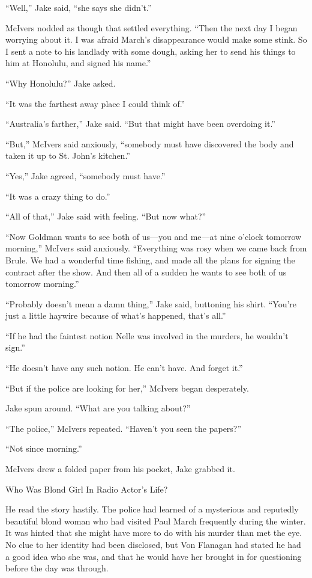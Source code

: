 \documentclass{novel}
\begin{document}
“Well,” Jake said, “she says she didn’t.”

McIvers nodded as though that settled everything. “Then the next day I began worrying about it. I was afraid March’s disappearance would make some stink. So I sent a note to his landlady with some dough, asking her to send his things to him at Honolulu, and signed his name.”

“Why Honolulu?” Jake asked.

“It was the farthest away place I could think of.”

“Australia’s farther,” Jake said. “But that might have been overdoing it.”

“But,” McIvers said anxiously, “somebody must have discovered the body and taken it up to St. John’s kitchen.”

“Yes,” Jake agreed, “somebody must have.”

“It was a crazy thing to do.”

“All of that,” Jake said with feeling. “But now what?”

“Now Goldman wants to see both of us—you and me—at nine o’clock tomorrow morning,” McIvers said anxiously. “Everything was rosy when we came back from Brule. We had a wonderful time fishing, and made all the plans for signing the contract after the show. And then all of a sudden he wants to see both of us tomorrow morning.”

“Probably doesn’t mean a damn thing,” Jake said, buttoning his shirt. “You’re just a little haywire because of what’s happened, that’s all.”

“If he had the faintest notion Nelle was involved in the murders, he wouldn’t sign.”

“He doesn’t have any such notion. He can’t have. And forget it.”

“But if the police are looking for her,” McIvers began desperately.

Jake spun around. “What are you talking about?”

“The police,” McIvers repeated. “Haven’t you seen the papers?”

“Not since morning.”

McIvers drew a folded paper from his pocket, Jake grabbed it.

Who Was Blond Girl In Radio Actor’s Life?

He read the story hastily. The police had learned of a mysterious and reputedly beautiful blond woman who had visited Paul March frequently during the winter. It was hinted that she might have more to do with his murder than met the eye. No clue to her identity had been disclosed, but Von Flanagan had stated he had a good idea who she was, and that he would have her brought in for questioning before the day was through.
\end{document}
